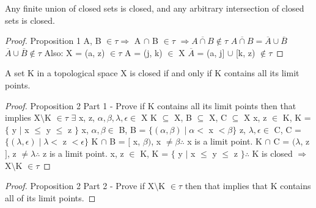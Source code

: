 \documentclass{article}
\begin{document}
  \begin{proposition}
      Any finite union of closed sets is closed, and any arbitrary intersection of closed sets is closed.
  \end{proposition}

  \begin{proof}
  	Proposition 1
  	\newline
	A, B $\in \tau \Rightarrow$ A $\cap$ B $\in \tau$ $\Rightarrow \overline{A \cap B} \not\in \tau$
	\newline
	$\overline{A \cap B} = \overline{A} \cup \overline{B}$
	\newline
	$\overline{A} \cup \overline{B} \not\in \tau$
	\newline \newline
	Also:
	\newline
	X = (a, z) $\in \tau$
	\newline
	A = (j, k) $\in$ X
	\newline
	$\overline{A}$ = (a, j] $\cup$ [k, z) $\not\in \tau$
  \end{proof}



	\begin{proposition}
		A set K in a topological space X is closed if and only if K contains all its limit points.
	\end{proposition}
	\begin{proof}
		Proposition 2 Part 1 - Prove if K contains all its limit points then that implies X$\setminus$K $\in \tau$
		\newline
		$\exists$ x, z, $\alpha, \beta, \lambda, \epsilon \in$ X
		\newline
		K $\subseteq$ X, B $\subseteq$ X, C $\subseteq$ X
		\newline
		x, z $\in$ K, K = $\lbrace$ y $\mid$ x $\leq$ y $\leq$ z $\rbrace$
		\newline
		x, $\alpha, \beta \in$ B, B = $\lbrace \left( \alpha, \beta \right) \mid \alpha <$ x $< \beta  \rbrace$
		\newline
		z, $\lambda, \epsilon \in$ C, C = $\lbrace \left( \lambda, \epsilon \right) \mid \lambda <$ z $< \epsilon \rbrace$
		\newline
		K $\cap$ B = $[$ x, $\beta  )$, x $\neq \beta \therefore$ x is a limit point.
		\newline
		K $\cap$ C = $( \lambda$, z $]$, z $\neq \lambda \therefore$ z is a limit point.
		\newline
		x, z $\in$ K, K = $\lbrace$ y $\mid$ x $\leq$ y $\leq$ z $\rbrace \therefore$ K is closed $\Rightarrow$ X$\setminus$K $\in \tau$
		\newline
	\end{proof}
	\begin{proof}
	Proposition 2 Part 2 - Prove if X$\setminus$K $\in \tau$ then that implies that K contains all of its limit points.
	\end{proof}
\end{document}
